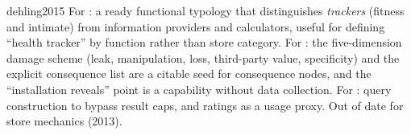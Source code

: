 \begin{papercard}{dehling2015}
 For : a ready functional typology that distinguishes \emph{trackers} (fitness and intimate) from information providers and calculators, useful for defining ``health tracker'' by function rather than store category. For : the five-dimension damage scheme (leak, manipulation, loss, third-party value, specificity) and the explicit consequence list are a citable seed for consequence nodes, and the ``installation reveals'' point is a capability without data collection. For : query construction to bypass result caps, and ratings as a usage proxy. Out of date for store mechanics (2013).
\end{papercard}
